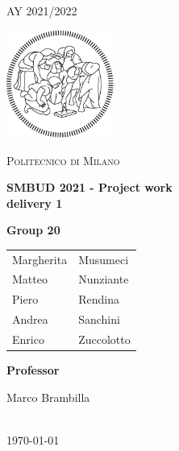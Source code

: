 \documentclass[a4paper, 12p]{article}
\begin{document}
\begin{titlepage}
    \centering
    {\scshape\large AY 2021/2022 \par}
    \vfill
    \includegraphics[width=100pt]{images/logo-polimi-new.pdf}\par\vspace{1cm}
    {\scshape\LARGE Politecnico di Milano \par}
    \vspace{1.5cm}
    {\huge\bfseries SMBUD 2021 - Project work\@ \\ delivery 1  \par}
    
    \vspace{1.5cm}
    {\large \textbf{Group 20} \par
    
    \begin{center}
        
         
        {\begin{tabular}{l l }
        Margherita & Musumeci \\
        Matteo & Nunziante \\
        Piero & Rendina \\
        Andrea & Sanchini \\
        Enrico & Zuccolotto \\
        \end{tabular}}
        
    \end{center}
    }
    \vfill
    \begin{center}
        {\large \textbf{Professor}\par
            Marco Brambilla}
          \vspace{1cm}
        {\large \\ \today \par}
    \end{center}
\end{titlepage}
\thispagestyle{plain}

\mbox{}


\tableofcontents
{}
\end{document}
